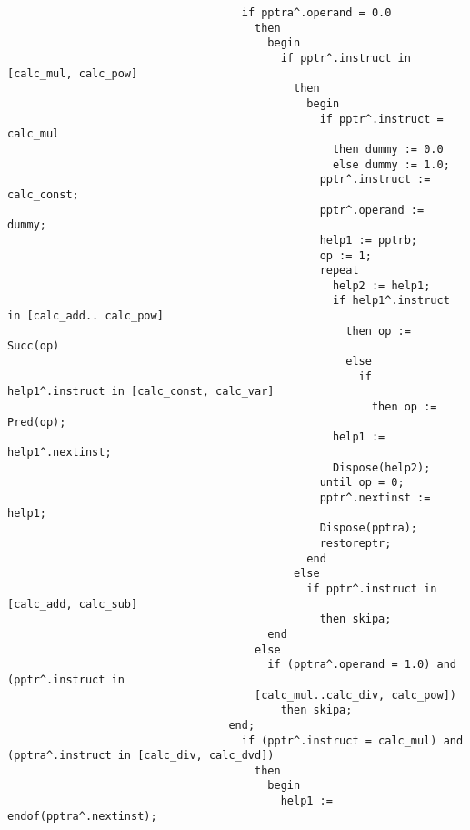 \begin{refsection}
\begin{lstlisting}
                                    if pptra^.operand = 0.0
                                      then
                                        begin
                                          if pptr^.instruct in [calc_mul, calc_pow]
                                            then
                                              begin
                                                if pptr^.instruct = calc_mul
                                                  then dummy := 0.0
                                                  else dummy := 1.0;
                                                pptr^.instruct := calc_const;
                                                pptr^.operand := dummy;
                                                help1 := pptrb;
                                                op := 1;
                                                repeat
                                                  help2 := help1;
                                                  if help1^.instruct in [calc_add.. calc_pow]
                                                    then op := Succ(op)
                                                    else
                                                      if help1^.instruct in [calc_const, calc_var]
                                                        then op := Pred(op);
                                                  help1 := help1^.nextinst;
                                                  Dispose(help2);
                                                until op = 0;
                                                pptr^.nextinst := help1;
                                                Dispose(pptra);
                                                restoreptr;
                                              end
                                            else
                                              if pptr^.instruct in [calc_add, calc_sub]
                                                then skipa;
                                        end
                                      else
                                        if (pptra^.operand = 1.0) and (pptr^.instruct in
                                      [calc_mul..calc_div, calc_pow])
                                          then skipa;
                                  end;
                                    if (pptr^.instruct = calc_mul) and (pptra^.instruct in [calc_div, calc_dvd])
                                      then
                                        begin
                                          help1 := endof(pptra^.nextinst);

\end{lstlisting}
\end{refsection}
